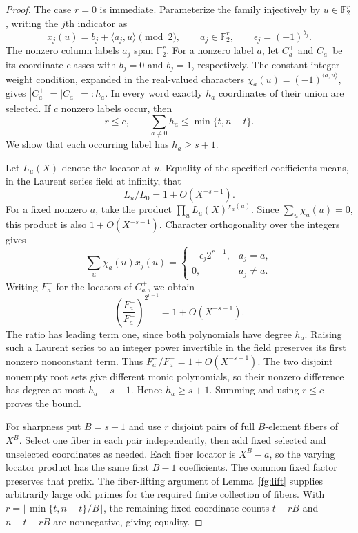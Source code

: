 \documentclass[11pt,letterpaper]{article}
\theoremstyle{definition}
\theoremstyle{remark}
\begin{document}
\begin{proof}
The case $r=0$ is immediate. Parameterize the family injectively by
$u\in\mathbb F_2^r$, writing the $j$th indicator as
\[
 x_j(u)=b_j+\langle a_j,u\rangle\pmod2,
 \qquad a_j\in\mathbb F_2^r,
 \qquad \epsilon_j=(-1)^{b_j}.
\]
The nonzero column labels $a_j$ span $\mathbb F_2^r$.
For a nonzero label $a$, let $C_a^+$ and $C_a^-$ be its coordinate
classes with $b_j=0$ and $b_j=1$, respectively.
The constant integer weight condition, expanded in the real-valued
characters $\chi_a(u)=(-1)^{\langle a,u\rangle}$, gives
$|C_a^+|=|C_a^-|=:h_a$. In every word exactly $h_a$ coordinates
of their union are selected. If $c$ nonzero labels occur, then
\[
 r\le c,\qquad
 \sum_{a\ne0}h_a\le\min\{t,n-t\}.
\]
We show that each occurring label has $h_a\ge s+1$.

Let $L_u(X)$ denote the locator at $u$. Equality of the specified
coefficients means, in the Laurent series field at infinity, that
\[
 L_u/L_0=1+O(X^{-s-1}).
\]
For a fixed nonzero $a$, take the product
$\prod_u L_u(X)^{\chi_a(u)}$. Since $\sum_u\chi_a(u)=0$, this
product is also $1+O(X^{-s-1})$. Character orthogonality over the
integers gives
\[
 \sum_u\chi_a(u)x_j(u)=
 \begin{cases}
 -\epsilon_j2^{r-1},&a_j=a,\\
 0,&a_j\ne a.
 \end{cases}
\]
Writing $F_a^\pm$ for the locators of $C_a^\pm$, we obtain
\[
 \left(\frac{F_a^-}{F_a^+}\right)^{2^{r-1}}
 =1+O(X^{-s-1}).
\]
The ratio has leading term one, since both polynomials have degree
$h_a$. Raising such a Laurent series to an integer power invertible
in the field preserves its first nonzero nonconstant term.
Thus $F_a^-/F_a^+=1+O(X^{-s-1})$. The two disjoint nonempty root
sets give different monic polynomials, so their nonzero difference
has degree at most $h_a-s-1$. Hence $h_a\ge s+1$. Summing and
using $r\le c$ proves the bound.

For sharpness put $B=s+1$ and use $r$ disjoint pairs of full
$B$-element fibers of $X^B$. Select one fiber in each pair
independently, then add fixed selected and unselected coordinates
as needed. Each fiber locator is $X^B-a$, so the varying locator
product has the same first $B-1$ coefficients. The common fixed
factor preserves that prefix. The fiber-lifting argument of
Lemma~\ref{fg:lift} supplies arbitrarily large odd primes for the
required finite collection of fibers. With
$r=\lfloor\min\{t,n-t\}/B\rfloor$, the remaining fixed-coordinate
counts $t-rB$ and $n-t-rB$ are nonnegative, giving equality.
\end{proof}
\end{document}
